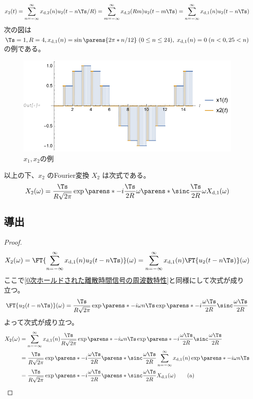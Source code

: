             \[ x_2(t) = \sum_{n=-\infty}^\infty \xdb(n)u_2(t-n\Ts/R) = \sum_{m=-\infty}^\infty \xdb(R m)u_2(t-m\Ts) = \sum_{n=-\infty}^\infty \xda(n)u_2(t-n\Ts) \]
            次の図は $\Ts=1,R=4,\xda(n) = \sin\parens{2\pi*n/12}\;(0\leq n\leq 24),\;\xda(n) = 0\;(n<0,25<n)$ の例である。
            \begin{figure}[H]
                \centering
                \includegraphics[keepaspectratio, scale=0.8]
                {parts/time-discretization/chapters/up-sampling/imgs/x1,x2.pdf}
                \caption{$x_1,x_2$の例}
                \label{アップサンプリング前後のDAC出力の例}
            \end{figure}
            以上の下、$x_2$ のFourier変換 $X_2$ は次式である。
            \[ X_2(\omega) = \frac{\Ts}{R\sqrt{2\pi}}\exp\parens*{-i\frac{\Ts}{2R}\omega}\parens*{\sinc \frac{\Ts}{2R}\omega}\Xda(\omega) \]
        \subsection{導出}
            \begin{proof}
                \quad\par
                \[ X_2(\omega) = \FT{\sum_{n=-\infty}^\infty \xda(n)u_2(t-n\Ts)}(\omega) = \sum_{n=-\infty}^\infty \xda(n)\FT{u_2(t-n\Ts)}(\omega) \]
                ここで\ref{0次ホールドされた離散時間信号の周波数特性}と同様にして次式が成り立つ。
                \[ \FT{u_2(t-n\Ts)}(\omega) = \frac{\Ts}{R\sqrt{2\pi}}\exp\parens*{-i \omega n\Ts}\exp\parens*{-i\frac{\omega\Ts}{2R}}\sinc\frac{\omega\Ts}{2R} \]
                よって次式が成り立つ。
                \begin{align*}
                    X_2(\omega) &= \sum_{n=-\infty}^\infty \xda(n)\frac{\Ts}{R\sqrt{2\pi}}\exp\parens*{-i \omega n\Ts}\exp\parens*{-i\frac{\omega\Ts}{2R}}\sinc\frac{\omega\Ts}{2R} \\
                    &= \frac{\Ts}{R\sqrt{2\pi}}\exp\parens*{-i\frac{\omega\Ts}{2R}}\parens*{\sinc\frac{\omega\Ts}{2R}} \sum_{n=-\infty}^\infty \xda(n)\exp\parens*{-i \omega n\Ts} \\
                    &= \frac{\Ts}{R\sqrt{2\pi}}\exp\parens*{-i\frac{\omega\Ts}{2R}}\parens*{\sinc\frac{\omega\Ts}{2R}} \Xda(\omega) \tag{a}
                \end{align*}
            \end{proof}
